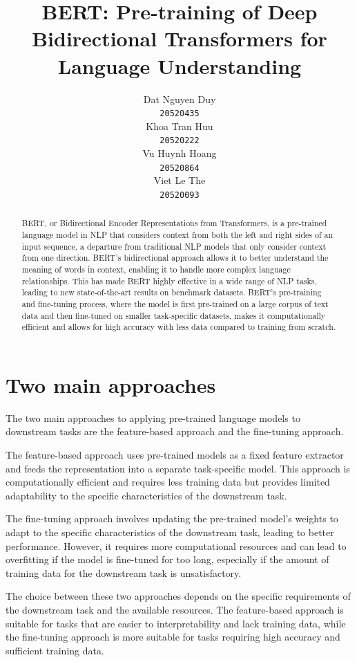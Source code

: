\documentclass[11pt]{article}
\title{BERT: Pre-training of Deep Bidirectional Transformers for Language Understanding}
\author{Dat Nguyen Duy \\
  {\tt 20520435} \\\And
  Khoa Tran Huu \\
  {\tt 20520222} \\\And
  Vu Huynh Hoang \\
  {\tt 20520864} \\\And
  Viet Le The \\
  {\tt 20520093} \\}
\date{}
\begin{document}
\maketitle
\begin{abstract}
\quad BERT, or Bidirectional Encoder Representations from Transformers, is a pre-trained language model in NLP that considers context from both the left and right sides of an input sequence, a departure from traditional NLP models that only consider context from one direction. BERT's bidirectional approach allows it to better understand the meaning of words in context, enabling it to handle more complex language relationships. This has made BERT highly effective in a wide range of NLP tasks, leading to new state-of-the-art results on benchmark datasets. BERT's pre-training and fine-tuning process, where the model is first pre-trained on a large corpus of text data and then fine-tuned on smaller task-specific datasets, makes it computationally efficient and allows for high accuracy with less data compared to training from scratch.
\end{abstract}

\section{Two main approaches}

\quad The two main approaches to applying pre-trained language models to downstream tasks are the feature-based approach and the fine-tuning approach.

The feature-based approach uses pre-trained models as a fixed feature extractor and feeds the representation into a separate task-specific model. This approach is computationally efficient and requires less training data but provides limited adaptability to the specific characteristics of the downstream task.

The fine-tuning approach involves updating the pre-trained model's weights to adapt to the specific characteristics of the downstream task, leading to better performance. However, it requires more computational resources and can lead to overfitting if the model is fine-tuned for too long, especially if the amount of training data for the downstream task is unsatisfactory.

The choice between these two approaches depends on the specific requirements of the downstream task and the available resources. The feature-based approach is suitable for tasks that are easier to interpretability and lack training data, while the fine-tuning approach is more suitable for tasks requiring high accuracy and sufficient training data.
\end{document}
